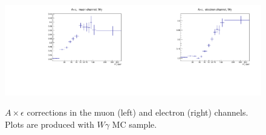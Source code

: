 \begin{figure}[htb]
  \begin{center}
  \includegraphics[width=0.5\textwidth]{../figs/figs_v11/MUON_WGamma/Constants/C_accXeff_MUON_WGamma.pdf}\includegraphics[width=0.5\textwidth]{../figs/figs_v11/ELECTRON_WGamma/Constants/C_accXeff_ELECTRON_WGamma.pdf}\\
  \label{fig:covMatricesaccXeff_Wg}
  \caption{$A\times\epsilon$ corrections in the muon (left) and electron (right) channels. Plots are produced with $W\gamma$ MC sample. }
  \end{center}
\end{figure}



